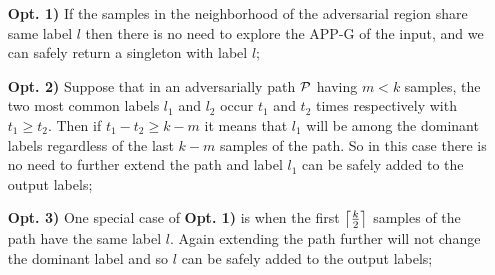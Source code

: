 \begin{enumerate}[wide, labelwidth=!, labelindent=0pt]
  \item[\textbf{Opt. 1)}] If the samples in the neighborhood of the adversarial region share same label $l$ then there is no need to explore the \acs{APP-G} of the input, and we can safely return a singleton with label $l$;
  \item[\textbf{Opt. 2)}] Suppose that in an adversarially path $\vpath$ having $m < k$ samples, the two most common labels $l_1$ and $l_2$ occur $t_1$ and $t_2$ times respectively with $t_1 \ge t_2$. Then if $t_1 - t_2 \ge k - m$ it means that $l_1$ will be among the dominant labels regardless of the last $k - m$ samples of the path. So in this case there is no need to further extend the path and label $l_1$ can be safely added to the output labels;
  \item[\textbf{Opt. 3)}] One special case of \textbf{Opt. 1)} is when the first $\ceil*{\frac{k}{2}}$ samples of the path have the same label $l$. Again extending the path further will not change the dominant label and so $l$ can be safely added to the output labels;
\end{enumerate}

